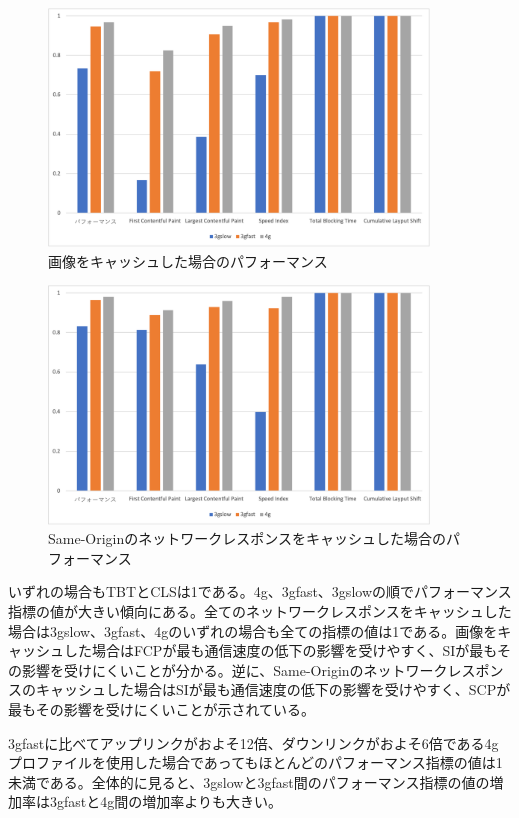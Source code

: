 \begin{figure}
  \centering
  \includegraphics[width=0.9\textwidth]{images/service_worker_cache_images.png}
  \caption{画像をキャッシュした場合のパフォーマンス}\label{figure:画像をキャッシュした場合のパフォーマンス}
\end{figure}
\begin{figure}
  \centering
  \includegraphics[width=0.9\textwidth]{images/service_worker_cache_same_origin.png}
  \caption{Same-Originのネットワークレスポンスをキャッシュした場合のパフォーマンス}\label{figure:Same-Originのネットワークレスポンスをキャッシュした場合のパフォーマンス}
\end{figure}
いずれの場合もTBTとCLSは1である。4g、3gfast、3gslowの順でパフォーマンス指標の値が大きい傾向にある。全てのネットワークレスポンスをキャッシュした場合は3gslow、3gfast、4gのいずれの場合も全ての指標の値は1である。画像をキャッシュした場合はFCPが最も通信速度の低下の影響を受けやすく、SIが最もその影響を受けにくいことが分かる。逆に、Same-Originのネットワークレスポンスのキャッシュした場合はSIが最も通信速度の低下の影響を受けやすく、SCPが最もその影響を受けにくいことが示されている。

3gfastに比べてアップリンクがおよそ12倍、ダウンリンクがおよそ6倍である4gプロファイルを使用した場合であってもほとんどのパフォーマンス指標の値は1未満である。全体的に見ると、3gslowと3gfast間のパフォーマンス指標の値の増加率は3gfastと4g間の増加率よりも大きい。